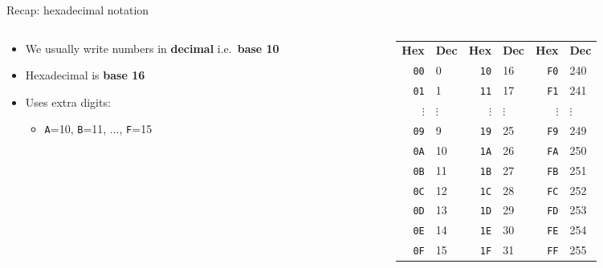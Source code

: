 \begin{frame}{Recap: hexadecimal notation}
	\begin{columns}
		\begin{column}{0.32\textwidth}
			\begin{itemize}
				\pause\item We usually write numbers in \textbf{decimal} i.e.\ \textbf{base 10}
				\pause\item Hexadecimal is \textbf{base 16}
				\pause\item Uses extra digits:
					\begin{itemize}
						\item \texttt{A}=10, \texttt{B}=11, ..., \texttt{F}=15
					\end{itemize}
			\end{itemize}
		\end{column}
		\pause
		\begin{column}{0.64\textwidth}
			\begin{tabular}{rl|rl|rl}
				\textbf{Hex} & \textbf{Dec} & \textbf{Hex} & \textbf{Dec} & \textbf{Hex} & \textbf{Dec} \\
				\texttt{00} & 0             & \texttt{10} & 16            & \texttt{F0} & 240           \\
				\texttt{01} & 1             & \texttt{11} & 17            & \texttt{F1} & 241           \\
				$\vdots$ & $\vdots$         & $\vdots$ & $\vdots$         & $\vdots$ & $\vdots$         \\
				\texttt{09} & 9             & \texttt{19} & 25            & \texttt{F9} & 249           \\
				\texttt{0A} & 10            & \texttt{1A} & 26            & \texttt{FA} & 250           \\
				\texttt{0B} & 11            & \texttt{1B} & 27            & \texttt{FB} & 251           \\
				\texttt{0C} & 12            & \texttt{1C} & 28            & \texttt{FC} & 252           \\
				\texttt{0D} & 13            & \texttt{1D} & 29            & \texttt{FD} & 253           \\
				\texttt{0E} & 14            & \texttt{1E} & 30            & \texttt{FE} & 254           \\
				\texttt{0F} & 15            & \texttt{1F} & 31            & \texttt{FF} & 255           
			\end{tabular}
		\end{column}
	\end{columns}
\end{frame}


